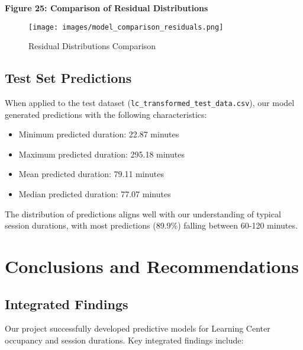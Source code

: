 \documentclass[12pt,letterpaper]{article}
\begin{document}
\textbf{Figure 25: Comparison of Residual Distributions}

\begin{figure}[H]
    \centering
    \texttt{[image: images/model\_comparison\_residuals.png]}
    \caption{Residual Distributions Comparison}
\end{figure}

\subsection{Test Set Predictions}

When applied to the test dataset (\texttt{lc\_transformed\_test\_data.csv}), our model generated predictions with the following characteristics:

\begin{itemize}
    \item Minimum predicted duration: 22.87 minutes
    \item Maximum predicted duration: 295.18 minutes
    \item Mean predicted duration: 79.11 minutes
    \item Median predicted duration: 77.07 minutes
\end{itemize}

The distribution of predictions aligns well with our understanding of typical session durations, with most predictions (89.9\%) falling between 60-120 minutes.

\section{Conclusions and Recommendations}

\subsection{Integrated Findings}

Our project successfully developed predictive models for Learning Center occupancy and session durations. Key integrated findings include:
\end{document}

